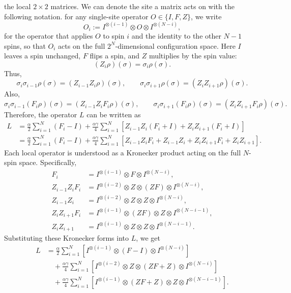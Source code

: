 \documentclass[12pt]{article}
\theoremstyle{definition}
\theoremstyle{remark}
\begin{document}
the local \(2\times 2\) matrices. We can denote the site a matrix acts on with the following notation. for any single-site operator \(O \in \{I, F, Z\}\), we write
\[
O_i := I^{\otimes(i-1)} \otimes O \otimes I^{\otimes(N-i)},
\]
for the operator that applies \(O\) to spin \(i\) and the identity to the other \(N-1\) spins, so that \(O_i\) acts on the full \(2^N\)-dimensional configuration space. 
Here \(I\) leaves a spin unchanged, \(F\) flips a spin, and \(Z\) multiplies by the spin value:
\[
(Z_i\rho)(\sigma)=\sigma_i\rho(\sigma).
\]
Thus,
\[
\sigma_i\sigma_{i-1}\rho(\sigma)
=
(Z_{i-1}Z_i\rho)(\sigma),
\qquad
\sigma_i\sigma_{i+1}\rho(\sigma)
=
(Z_iZ_{i+1}\rho)(\sigma).
\]
Also,
\[
\sigma_i\sigma_{i-1}(F_i\rho)(\sigma)
=
(Z_{i-1}Z_iF_i\rho)(\sigma),
\qquad
\sigma_i\sigma_{i+1}(F_i\rho)(\sigma)
=
(Z_iZ_{i+1}F_i\rho)(\sigma).
\]
Therefore, the operator \(L\) can be written as
\begin{align*}
L
&=
\frac{\alpha}{2}
\sum_{i=1}^N
(F_i-I)
+
\frac{\alpha\gamma}{4}
\sum_{i=1}^N
\left[
Z_{i-1}Z_i(F_i+I)
+
Z_iZ_{i+1}(F_i+I)
\right] \\[4pt]
&=
\frac{\alpha}{2}
\sum_{i=1}^N
(F_i-I)
+
\frac{\alpha\gamma}{4}
\sum_{i=1}^N
\left[
Z_{i-1}Z_iF_i
+
Z_{i-1}Z_i
+
Z_iZ_{i+1}F_i
+
Z_iZ_{i+1}
\right].
\end{align*}
Each local operator is understood as a Kronecker product acting on the full \(N\)-spin space. Specifically,
\begin{align*}
F_i
&=
I^{\otimes(i-1)}
\otimes F
\otimes I^{\otimes(N-i)}, \\[4pt]
Z_{i-1}Z_iF_i
&=
I^{\otimes(i-2)}
\otimes Z
\otimes (ZF)
\otimes I^{\otimes(N-i)}, \\[4pt]
Z_{i-1}Z_i
&=
I^{\otimes(i-2)}
\otimes Z
\otimes Z
\otimes I^{\otimes(N-i)}, \\[4pt]
Z_iZ_{i+1}F_i
&=
I^{\otimes(i-1)}
\otimes (ZF)
\otimes Z
\otimes I^{\otimes(N-i-1)}, \\[4pt]
Z_iZ_{i+1}
&=
I^{\otimes(i-1)}
\otimes Z
\otimes Z
\otimes I^{\otimes(N-i-1)}.
\end{align*}
Substituting these Kronecker forms into \(L\), we get
\begin{align*}
L
&=
\frac{\alpha}{2}
\sum_{i=1}^N
\left[
I^{\otimes(i-1)}
\otimes (F-I)
\otimes I^{\otimes(N-i)}
\right] \\[4pt]
&\quad
+
\frac{\alpha\gamma}{4}
\sum_{i=1}^N
\left[
I^{\otimes(i-2)}
\otimes Z
\otimes (ZF+Z)
\otimes I^{\otimes(N-i)}
\right] \\[4pt]
&\quad
+
\frac{\alpha\gamma}{4}
\sum_{i=1}^N
\left[
I^{\otimes(i-1)}
\otimes (ZF+Z)
\otimes Z
\otimes I^{\otimes(N-i-1)}
\right].
\end{align*}
\end{document}
